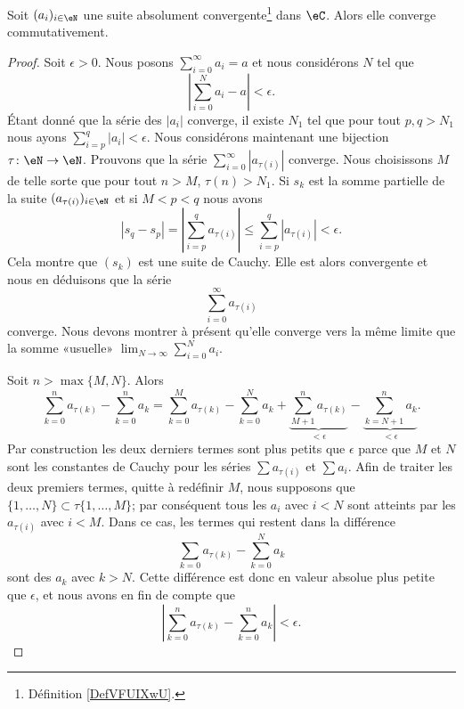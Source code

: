 \begin{proposition} \label{PopriXWvIY}
	Soit \( (a_i)_{i\in \eN}\) une suite absolument convergente\footnote{Définition \ref{DefVFUIXwU}.} dans \( \eC\). Alors elle converge commutativement.
\end{proposition}

\begin{proof}
	Soit \( \epsilon>0\). Nous posons \( \sum_{i=0}^\infty a_i=a\) et nous considérons \( N\) tel que
	\begin{equation}
		| \sum_{i=0}^Na_i-a |<\epsilon.
	\end{equation}
	Étant donné que la série des \( | a_i |\) converge, il existe \( N_1\) tel que pour tout \( p,q>N_1\) nous ayons \( \sum_{i=p}^q| a_i |<\epsilon\). Nous considérons maintenant une bijection \( \tau\colon \eN\to \eN \). Prouvons que la série \( \sum_{i=0}^{\infty}| a_{\tau(i)} |\) converge. Nous choisissons \( M\) de telle sorte que pour tout \( n>M\), \( \tau(n)>N_1\). Si \( s_k\) est la somme partielle de la suite \( ( a_{\tau(i)} )_{i\in \eN}\) et si \( M<p<q \) nous avons
	\begin{equation}
		| s_q-s_p |= | \sum_{i=p}^q a_{\tau(i)} | \leq \sum_{i=p}^q| a_{\tau(i)} |<\epsilon.
	\end{equation}
	Cela montre que \( (s_k)\) est une suite de Cauchy. Elle est alors convergente et nous en déduisons que la série
	\begin{equation}
		\sum_{i=0}^{\infty}a_{\tau(i)}
	\end{equation}
	converge. Nous devons montrer à présent qu'elle converge vers la même limite que la somme «usuelle» \( \lim_{N\to \infty} \sum_{i=0}^Na_i\).

	Soit \( n>\max\{ M,N \}\). Alors
	\begin{equation}
		\sum_{k=0}^na_{\tau(k)}-\sum_{k=0}^na_k=\sum_{k=0}^Ma_{\tau(k)}-\sum_{k=0}^Na_k+\underbrace{\sum_{M+1}^na_{\tau(k)}}_{<\epsilon}-\underbrace{\sum_{k=N+1}^na_k}_{<\epsilon}.
	\end{equation}
	Par construction les deux derniers termes sont plus petits que \( \epsilon\) parce que \( M\) et \( N\) sont les constantes de Cauchy pour les séries \( \sum a_{\tau(i)}\) et \( \sum a_i\). Afin de traiter les deux premiers termes, quitte à redéfinir \( M\), nous supposons que \( \{ 1,\ldots, N \}\subset \tau\{ 1,\ldots, M \}\); par conséquent tous les \( a_i\) avec \( i<N\) sont atteints par les \( a_{\tau(i)}\) avec \( i<M\). Dans ce cas, les termes qui restent dans la différence
	\begin{equation}
		\sum_{k=0}a_{\tau(k)}-\sum_{k=0}^Na_k
	\end{equation}
	sont des \( a_k\) avec \( k>N\). Cette différence est donc en valeur absolue plus petite que \( \epsilon\), et nous avons en fin de compte que
	\begin{equation}
		\left| \sum_{k=0}^na_{\tau(k)}-\sum_{k=0}^na_k \right| <\epsilon.
	\end{equation}
\end{proof}

